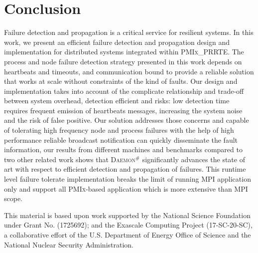 \documentclass[sigconf]{acmart}
\newcommand{\prrte}[0]{\textsc{PRRTE}\xspace}
\newcommand{\pmix}[0]{\textsc{PMIx}\xspace}
\newcommand{\mpi}[0]{\textsc{MPI}\xspace}
\newcommand{\ourwork}[0]{\textsc{Daemon}\ensuremath{^\#}\xspace}
\begin{document}
\section{Conclusion}\label{sec:conclusion}
Failure detection and propagation is a critical service for resilient systems. In this work, we present an efficient failure detection and propagation design and implementation for distributed systems integrated within \pmix\_\prrte. The process and node failure detection strategy presented in this work depends on heartbeats and timeouts, and communication bound to provide a reliable solution that works at scale without constraints of the kind of faults. Our design and implementation takes into account of the complicate relationship and trade-off between system overhead, detection efficient and risks: low detection time requires frequent emission of heartbeats messages, increasing the system noise and the risk of false positive. Our solution addresses those concerns and capable of tolerating high frequency node and process failures with the help of high performance reliable broadcast notification can quickly disseminate the fault information, our results from different machines and benchmarks compared to two other related work shows that \ourwork significantly advances the state of art with respect to efficient detection and propagation of failures. This runtime level failure tolerate implementation breaks the limit of running \mpi  application only and support all \pmix-based application which is more extensive than \mpi scope.   


%
\begin{acks}
This material is based upon work supported by the National Science Foundation under Grant No. (1725692); and the Exascale Computing Project (17-SC-20-SC), a collaborative effort of the 
U.S. Department of Energy Office of Science and the National Nuclear Security Administration.    
\end{acks}

%


\end{document}
